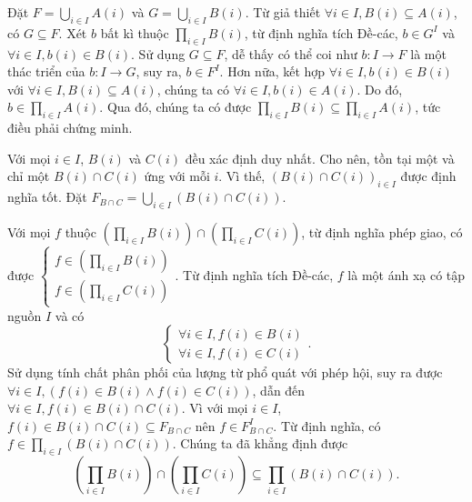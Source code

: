 \solution 

\resetSubexercise Đặt $F = \bigcup_{i \in I}A(i)$ và $G = \bigcup_{i \in I}B(i)$. Từ giả thiết $\forall i \in I, B(i) \subseteq A(i)$, có $G \subseteq F$. Xét $b$ bất kì thuộc $\prod_{i \in I}B(i)$, từ định nghĩa tích Đề-các, $b \in G^I$ và $\forall i \in I, b(i) \in B(i)$. Sử dụng $G \subseteq F$, dễ thấy có thể coi như $b: I \to F$ là một thác triển của $b: I \to G$, suy ra, $b \in F^I$. Hơn nữa, kết hợp $\forall i \in I, b(i) \in B(i)$ với $\forall i \in I, B(i) \subseteq A(i)$, chúng ta có $\forall i \in I, b(i) \in A(i)$. Do đó, $b \in \prod_{i \in I}A(i)$. Qua đó, chúng ta có được $\prod_{i \in I}B(i) \subseteq \prod_{i \in I}A(i)$, tức điều phải chứng minh.

\stepSubexercise Với mọi $i \in I$, $B(i)$ và $C(i)$ đều xác định duy nhất. Cho nên, tồn tại một và chỉ một $B(i) \cap C(i)$ ứng với mỗi $i$. Vì thế, $\left(B(i) \cap C(i)\right)_{i \in I}$ được định nghĩa tốt. Đặt $F_{B \cap C} = \bigcup_{i \in I}(B(i) \cap C(i))$.

Với mọi $f$ thuộc $\left(\prod_{i \in I}B(i)\right) \cap \left(\prod_{i \in I}C(i)\right)$, từ định nghĩa phép giao, có được $\begin{cases}
   f \in \left(\prod_{i \in I}B(i)\right) \\
   f \in \left(\prod_{i \in I}C(i)\right)
\end{cases}$. Từ định nghĩa tích Đề-các, $f$ là một ánh xạ có tập nguồn $I$ và có \begin{equation*}
   \begin{cases}
      \forall i \in I, f(i) \in B(i) \\
      \forall i \in I, f(i) \in C(i)
   \end{cases}.
\end{equation*}
Sử dụng tính chất phân phối của lượng từ phổ quát với phép hội, suy ra được $\forall i \in I, \left( f(i) \in B(i) \land f(i) \in C(i) \right)$, dẫn đến $\forall i \in I, f(i) \in B(i) \cap C(i)$. Vì với mọi $i \in I$, $f(i) \in B(i) \cap C(i) \subseteq F_{B \cap C}$ nên $f \in F_{B \cap C}^I$. Từ định nghĩa, có $f \in \prod_{i \in I}(B(i) \cap C(i))$. Chúng ta đã khẳng định được \begin{equation*}
   \left(\prod_{i \in I}B(i)\right) \cap \left(\prod_{i \in I}C(i)\right) \subseteq \prod_{i \in I}(B(i) \cap C(i)).
\end{equation*}

